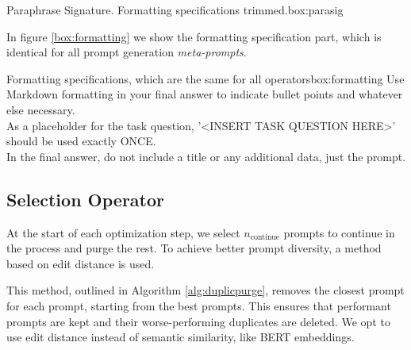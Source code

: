 \begin{figurebox}{Paraphrase Signature. Formatting specifications trimmed.}{box:parasig}
\end{figurebox}
In figure \ref{box:formatting} we show the formatting specification part, which is identical for all prompt generation \textit{meta-prompts}.

\begin{figurebox}{Formatting specifications, which are the same for all operators}{box:formatting}
    Use Markdown formatting in your final answer to indicate bullet points and whatever else necessary.\\
    As a placeholder for the task question, '<INSERT TASK QUESTION HERE>' should be used exactly ONCE.\\
    In the final answer, do not include a title or any additional data, just the prompt.
\end{figurebox}

\subsection{Selection Operator}
At the start of each optimization step, we select $n_{\text{continue}}$ prompts to continue in the process and purge the rest. 
To achieve better prompt diversity, a method based on edit distance is used. 

This method, outlined in Algorithm \ref{alg:duplicpurge},
removes the closest prompt for each prompt, starting from the best prompts. This ensures that performant prompts are kept and their worse-performing duplicates are deleted.
We opt to use edit distance instead of semantic similarity, like BERT embeddings.

